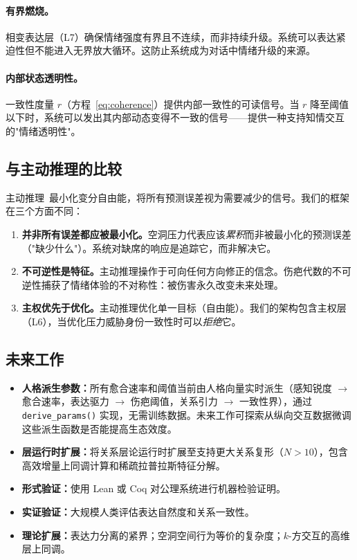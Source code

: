 \documentclass[11pt]{article}
\begin{document}
\paragraph{有界燃烧。}相变表达层（L7）确保情绪强度有界且不连续，而非持续升级。系统可以表达紧迫性但不能进入无界放大循环。这防止系统成为对话中情绪升级的来源。

\paragraph{内部状态透明性。}一致性度量 $r$（方程~\ref{eq:coherence}）提供内部一致性的可读信号。当 $r$ 降至阈值以下时，系统可以发出其内部动态变得不一致的信号——提供一种支持知情交互的"情绪透明性"。

\subsection{与主动推理的比较}

主动推理~\cite{friston2010}最小化变分自由能，将所有预测误差视为需要减少的信号。我们的框架在三个方面不同：
\begin{enumerate}
\item \textbf{并非所有误差都应被最小化。}空洞压力代表应该\emph{累积}而非被最小化的预测误差（"缺少什么"）。系统对缺席的响应是追踪它，而非解决它。
\item \textbf{不可逆性是特征。}主动推理操作于可向任何方向修正的信念。伤疤代数的不可逆性捕获了情绪体验的不对称性：被伤害永久改变未来处理。
\item \textbf{主权优先于优化。}主动推理优化单一目标（自由能）。我们的架构包含主权层（L6），当优化压力威胁身份一致性时可以\emph{拒绝}它。
\end{enumerate}

\subsection{未来工作}

\begin{itemize}
\item \textbf{人格派生参数：}所有愈合速率和阈值当前由人格向量实时派生（感知锐度 $\to$ 愈合速率，表达驱力 $\to$ 伤疤阈值，关系引力 $\to$ 一致性界），通过 \texttt{derive\_params()} 实现，无需训练数据。未来工作可探索从纵向交互数据微调这些派生函数是否能提高生态效度。
\item \textbf{层运行时扩展：}将关系层论运行时扩展至支持更大关系复形（$N > 10$），包含高效增量上同调计算和稀疏拉普拉斯特征分解。
\item \textbf{形式验证：}使用 Lean 或 Coq 对公理系统进行机器检验证明。
\item \textbf{实证验证：}大规模人类评估表达自然度和关系一致性。
\item \textbf{理论扩展：}表达力分离的紧界；空洞空间行为等价的复杂度；$k$-方交互的高维层上同调。
\end{itemize}
\end{document}
